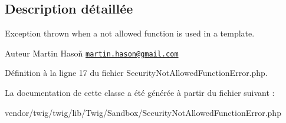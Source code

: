\subsection{Description détaillée}
Exception thrown when a not allowed function is used in a template.

\begin{DoxyAuthor}{Auteur}
Martin Hasoň \href{mailto:martin.hason@gmail.com}{\tt martin.\+hason@gmail.\+com} 
\end{DoxyAuthor}


Définition à la ligne 17 du fichier Security\+Not\+Allowed\+Function\+Error.\+php.



La documentation de cette classe a été générée à partir du fichier suivant \+:\begin{DoxyCompactItemize}
\item 
vendor/twig/twig/lib/\+Twig/\+Sandbox/Security\+Not\+Allowed\+Function\+Error.\+php\end{DoxyCompactItemize}
